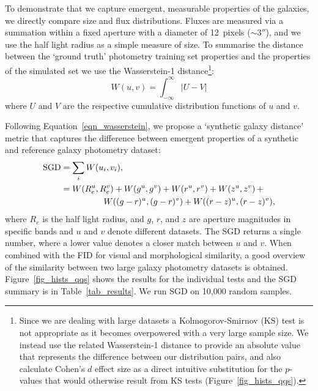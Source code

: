 \documentclass[fleqn,usenatbib]{mnras}
\begin{document}
To demonstrate that we capture emergent, measurable properties of the galaxies,
we directly compare size and flux distributions. Fluxes are measured via a
summation within a fixed aperture with a diameter of 12~pixels ($\sim$3$''$),
and we use the half light radius as a simple measure of size. To summarise the
distance between the `ground truth' photometry training set properties and the
properties of the simulated set we use the Wasserstein-1 distance\footnote{
    Since we are dealing with large datasets a Kolmogorov-Smirnov
    (KS) test is not appropriate as it becomes overpowered with a very large sample size.  We
    instead use the related Wasserstein-1 distance to provide an absolute value
    that represents the difference between our distribution pairs, and also
    calculate Cohen's $d$ effect size as a direct intuitive substitution for
    the $p$-values that would otherwise result from KS tests
    (Figure~\ref{fig_hists_qqs}).
}:
\begin{equation}
    W(u, v) = \int_{-\infty}^\infty \left\vert U - V \right\vert
    \label{eqn_wasserstein}
\end{equation}
where $U$ and $V$ are the respective cumulative distribution functions of $u$ and $v$.
 
Following Equation~\ref{eqn_wasserstein}, we propose a `synthetic galaxy
distance' metric that captures the difference between emergent properties of a
synthetic and reference galaxy photometry dataset:
\begin{align}
    \text{SGD} &= \sum_i W(u_i, v_i),\notag\\
               &= W(R_e^u, R_e^v) +
                  W(g^u, g^v) +
                  W(r^u, r^v) +
                  W(z^u, z^v)\,+ \notag\\
                  &\hspace{5em}W((g - r)^u, (g - r)^v) +
                  W((r -z)^u, (r - z)^v),
    \label{eqn_sgd}
\end{align}
where $R_e$ is the half light radius, and $g$, $r$, and $z$ are aperture
magnitudes in specific bands and $u$ and $v$ denote different datasets. The SGD
returns a single number, where a lower value denotes a closer match between $u$
and $v$.  When combined with the FID for visual and morphological similarity,
a good overview of the similarity between two large galaxy photometry datasets
is obtained. Figure~\ref{fig_hists_qqs} shows the results for the individual
tests and the SGD summary is in Table~\ref{tab_results}.  We run SGD on 10,000
random samples.
\end{document}
